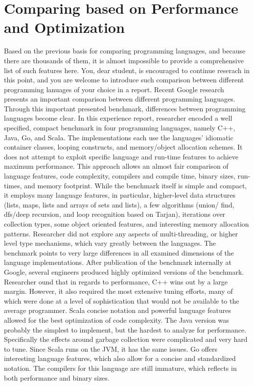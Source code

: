 \documentclass[12pt,a4paper,final,twoside,titlepage]{book}
\begin{document}
\section{Comparing based on Performance and Optimization}
Based on the previous basis for comparing programming languages, and because there are thousands of them, it is almost impossible to provide a comprehensive list of such features here. You, dear student, is encouraged to continue reserach in this point, and you are welcome to introduce such comparison between different programming lanuages of your choice in a report. Recent Google research \cite{Robert-Google} presents an important comparison between different programming languages. Through this important presented benchmark, differences between programming languages become clear. In this experience report, researcher encoded a well specified, compact benchmark in four programming languages, namely C++, Java, Go, and Scala. The implementations each use the languages' idiomatic container classes, looping constructs, and memory/object allocation schemes. It does not attempt to exploit specific language and run-time features to achieve maximum performance. This approach allows an almost fair comparison of language features, code complexity, compilers and compile time, binary sizes, run-times, and memory footprint. While the benchmark itself is simple and compact, it employs many language features, in particular, higher-level data structures (lists, maps, lists and arrays of sets and lists), a few algorithms (union/ find, dfs/deep recursion, and loop recognition based on Tarjan), iterations over collection types, some object oriented features, and interesting memory allocation patterns. Researcher did not explore any aspects of multi-threading, or higher level  type mechanisms, which vary greatly between the languages. The benchmark points to very large differences in all examined dimensions of the language implementations. After publication of the benchmark internally at Google, several engineers produced highly optimized versions of the benchmark. Researcher ound that in regards to performance, C++ wins out by a large margin. However, it also required the most extensive tuning efforts, many of which were done at a level of sophistication that would not be available to the average programmer. Scala concise notation and powerful language features allowed for the best optimization of code complexity. The Java version was probably the simplest to implement, but the hardest to analyze for performance. Specifically the effects around garbage collection were complicated and very hard to tune. Since Scala runs on the JVM, it has the same issues. Go offers interesting language features, which also allow for a concise and standardized notation. The compilers for this language are still immature, which reflects in both performance and binary sizes.
\end{document}
